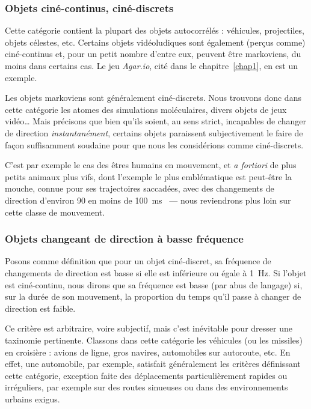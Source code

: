 	\FloatBarrier \subsubsection{Objets ciné-continus, ciné-discrets}
	Cette catégorie contient la plupart des objets autocorrélés : véhicules, projectiles, objets célestes, etc. Certains objets vidéoludiques sont également (perçus comme) ciné-continus et, pour un petit nombre d'entre eux, peuvent être markoviens, du moins dans certains cas. Le jeu \emph{Agar.io}, cité dans le chapitre~\ref{chap1}, en est un exemple.
	
	Les objets markoviens sont généralement ciné-discrets. Nous trouvons donc dans cette catégorie les atomes des simulations moléculaires, divers objets de jeux vidéo\ldots{} Mais précisons que bien qu'ils soient, au sens strict, incapables de changer de direction \emph{instantanément}, certains objets paraissent subjectivement le faire de façon suffisamment soudaine pour que nous les considérions comme ciné-discrets.
	
	C'est par exemple le cas des êtres humains en mouvement, et \emph{a fortiori} de plus petits animaux plus vifs, dont l'exemple le plus emblématique est peut-être la mouche, connue pour ses trajectoires saccadées, avec des changements de direction d'environ 90\textdegree{} en moins de 100~ms~\cite{tammero2002influence, collett1975visual, wagner1986flight, schilstra1999blowfly} --- nous reviendrons plus loin sur cette classe de mouvement.
	
	\FloatBarrier \subsubsection{Objets changeant de direction à basse fréquence}
	Posons comme définition que pour un objet ciné-discret, sa fréquence de changements de direction est \og basse \fg{} si elle est inférieure ou égale à 1~Hz. Si l'objet est ciné-continu, nous dirons que sa fréquence est basse (par abus de langage) si, sur la durée de son mouvement, la proportion du temps qu'il passe à changer de direction est faible.
	
	Ce critère est arbitraire, voire subjectif, mais c'est inévitable pour dresser une taxinomie pertinente. Classons dans cette catégorie les véhicules (ou les missiles) \og en croisière \fg{} : avions de ligne, gros navires, automobiles sur autoroute, etc. En effet, une automobile, par exemple, satisfait généralement les critères définissant cette catégorie, exception faite des déplacements particulièrement rapides ou irréguliers, par exemple sur des routes sinueuses ou dans des environnements urbains exigus.
	
